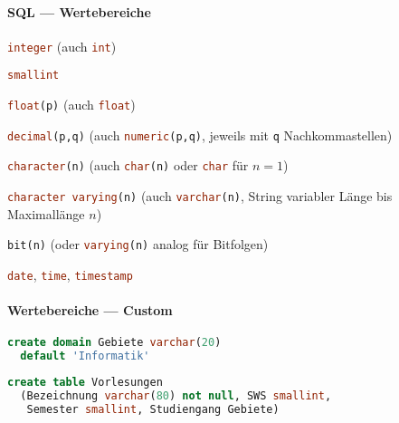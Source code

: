 \paragraph{SQL --- Wertebereiche}
\begin{items}
	\item \lstinline[language=sql]{integer} (auch \lstinline[language=sql]{int})
	\item \lstinline[language=sql]{smallint}
	\item \lstinline[language=sql]{float(p)} (auch \lstinline[language=sql]{float})
	\item \lstinline[language=sql]{decimal(p,q)} (auch \lstinline[language=sql]{numeric(p,q)}, jeweils mit \lstinline[language=sql]{q} Nachkommastellen)
	\item \lstinline[language=sql]{character(n)} (auch \lstinline[language=sql]{char(n)} oder \lstinline[language=sql]{char} für \( n=1 \))
	\item \lstinline[language=sql]{character varying(n)} (auch \lstinline[language=sql]{varchar(n)}, String variabler Länge bis Maximallänge \( n \))
	\item \lstinline[language=sql]{bit(n)} (oder \lstinline[language=sql]{varying(n)} analog für Bitfolgen)
	\item \lstinline[language=sql]{date}, \lstinline[language=sql]{time}, \lstinline[language=sql]{timestamp}
\end{items}

\paragraph{Wertebereiche --- Custom}
\begin{items}
	\item \begin{lstlisting}[language=sql]
create domain Gebiete varchar(20)
  default 'Informatik'
\end{lstlisting}
	\item \begin{lstlisting}[language=sql]
create table Vorlesungen
  (Bezeichnung varchar(80) not null, SWS smallint,
   Semester smallint, Studiengang Gebiete)
\end{lstlisting}
\end{items}

